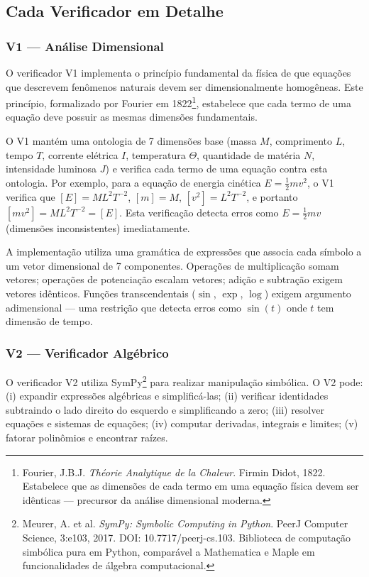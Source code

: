
\subsection{Cada Verificador em Detalhe}

\subsubsection{V1 — Análise Dimensional}

O verificador V1 implementa o princípio fundamental da física de que equações
que descrevem fenômenos naturais devem ser dimensionalmente homogêneas. Este
princípio, formalizado por Fourier em 1822\footnote{Fourier, J.B.J. \textit{Théorie
Analytique de la Chaleur}. Firmin Didot, 1822. Estabelece que as dimensões de
cada termo em uma equação física devem ser idênticas — precursor da análise
dimensional moderna.}, estabelece que cada termo de uma equação deve possuir as
mesmas dimensões fundamentais.

O V1 mantém uma ontologia de 7 dimensões base (massa $M$, comprimento $L$,
tempo $T$, corrente elétrica $I$, temperatura $\Theta$, quantidade de matéria
$N$, intensidade luminosa $J$) e verifica cada termo de uma equação contra
esta ontologia. Por exemplo, para a equação de energia cinética $E = \frac{1}{2}mv^2$,
o V1 verifica que $[E] = ML^2T^{-2}$, $[m] = M$, $[v^2] = L^2T^{-2}$, e
portanto $[mv^2] = ML^2T^{-2} = [E]$. Esta verificação detecta erros como
$E = \frac{1}{2}mv$ (dimensões inconsistentes) imediatamente.

A implementação utiliza uma gramática de expressões que associa cada símbolo
a um vetor dimensional de 7 componentes. Operações de multiplicação somam
vetores; operações de potenciação escalam vetores; adição e subtração exigem
vetores idênticos. Funções transcendentais ($\sin$, $\exp$, $\log$) exigem
argumento adimensional — uma restrição que detecta erros como $\sin(t)$ onde
$t$ tem dimensão de tempo.

\subsubsection{V2 — Verificador Algébrico}

O verificador V2 utiliza SymPy\footnote{Meurer, A. et al. \textit{SymPy: Symbolic
Computing in Python}. PeerJ Computer Science, 3:e103, 2017. DOI:
10.7717/peerj-cs.103. Biblioteca de computação simbólica pura em Python,
comparável a Mathematica e Maple em funcionalidades de álgebra computacional.}
para realizar manipulação simbólica. O V2 pode: (i) expandir expressões
algébricas e simplificá-las; (ii) verificar identidades subtraindo o lado
direito do esquerdo e simplificando a zero; (iii) resolver equações e sistemas
de equações; (iv) computar derivadas, integrais e limites; (v) fatorar
polinômios e encontrar raízes.

